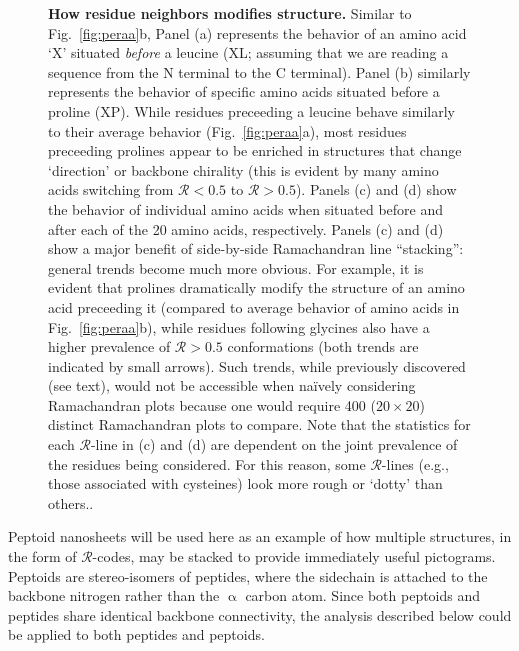 \documentclass[fleqn,10pt,lineno]{wlpeerj} %
\newcommand{\Fig}[1]{Fig.~\ref{#1}}
\newcommand{\n}[1]{{\color{red}#1}}
\newcommand{\rr}{$\mathcal{R}$\xspace}
\begin{document}
\begin{figure}
\begin{adjustwidth}{-1in}{0in}
\caption{\textbf{\n{How residue neighbors modifies structure.}} Similar to \Fig{fig:peraa}b, Panel (a) represents the behavior of an amino acid `X' situated {\it before} a leucine (XL; assuming that we are reading a sequence from the N terminal to the C terminal). Panel (b) similarly represents the behavior of specific amino acids situated before a proline (XP). While residues preceeding a leucine behave similarly to their average behavior (\Fig{fig:peraa}a), most residues preceeding prolines appear to be enriched in structures that change `direction' or backbone chirality (this is evident by many amino acids switching from \rr$<0.5$ to \rr$>0.5$). 
Panel\n{s} (c) \n{and (d) show} the behavior of individual amino acids when situated before \n{and after} each of the 20 amino acids\n{, respectively}. 
\n{Panels (c) and (d)} show a major benefit of side-by-side Ramachandran line ``stacking'': general trends become much more obvious. For example, it is evident that prolines dramatically modify the structure of an amino acid preceeding it (compared to average behavior of amino acids in \Fig{fig:peraa}b)\n{, while residues following glycines also have a higher prevalence of $\mathcal{R} > 0.5$ conformations (both trends are indicated by small arrows)}. 
Such trends, while previously discovered \n{(see text)}, would not be accessible when na{\"i}vely considering Ramachandran plots because one would require 400 ($20\times 20$) distinct Ramachandran plots to compare. \n{Note that the statistics for each \rr-line in (c) and (d) are dependent on the joint prevalence of the residues being considered. For this reason, some \rr-lines (e.g., those associated with cysteines) look more rough or `dotty' than others.}.%
\label{fig:motifs}}
\end{adjustwidth}
\end{figure}

Peptoid nanosheets \citep{Mannige2015} will be used here as an example of how multiple structures, in the form of \rr-codes, may be stacked to provide immediately useful pictograms. \n{Peptoids are stereo-isomers of peptides, where the sidechain is attached to the backbone nitrogen 
rather than the $\upalpha$ carbon atom. Since both peptoids and peptides share identical backbone connectivity, the analysis described below could be applied to both peptides and peptoids.}
\end{document}
